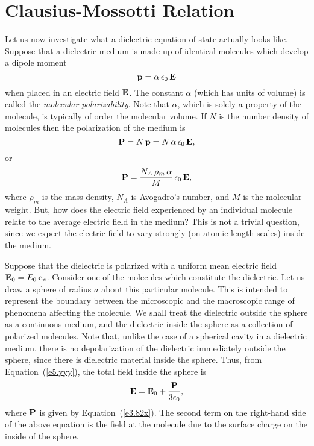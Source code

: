 \section{Clausius-Mossotti Relation}
Let us now investigate  what a dielectric equation of state actually looks like.
Suppose that a dielectric medium is made up of identical molecules which
develop a dipole moment 
\begin{equation}
{\bf p} = \alpha\,\epsilon_0 \,{\bf E} 
\end{equation}
when placed in an electric field ${\bf E}$. The constant $\alpha$ (which has units of volume) is called
the {\em molecular polarizability}. Note that $\alpha$, which is solely a property of the molecule, is typically of order the
molecular volume.
If $N$ is the number density of
 molecules
then the polarization of the medium is
\begin{equation}
{\bf P} = N \,{\bf p} = N\,\alpha \,\epsilon_0 \,{\bf E},
\end{equation}
or
\begin{equation}\label{e3.82x}
{\bf P} = \frac{N_A\, \rho_m\, \alpha}{M} \,\epsilon_0 \,{\bf E},
\end{equation}
where $\rho_m$ is the mass density, $N_A$ is Avogadro's number, and $M$ is 
the molecular weight. But, how does the electric field experienced
by an individual molecule relate to the average electric field in the
medium? This is not a trivial question, since we expect the electric
field to vary strongly (on atomic length-scales) inside the medium.

Suppose that the dielectric is polarized with a uniform mean electric field
${\bf E}_0 = E_0\,{\bf e}_z$. Consider one of the molecules which constitute
the dielectric. Let us draw a sphere of radius $a$ about this particular
molecule. This is intended to represent the boundary between the microscopic
and the macroscopic range of phenomena affecting the molecule. We shall
treat the dielectric outside the sphere as a continuous medium, and the
dielectric inside the sphere as a collection of polarized molecules. 
Note that, unlike the case of a spherical cavity in a dielectric medium,
there is no depolarization of the dielectric immediately outside the sphere,
since there is dielectric material inside the sphere.
Thus, from Equation~(\ref{e5.yyy}), the total field inside the sphere is 
\begin{equation}
{\bf E} = {\bf E}_0 + \frac{\bf P}{3\epsilon_0},
\end{equation}
where ${\bf P}$ is given by Equation~(\ref{e3.82x}).  The second term on the right-hand side of the above equation is the field
at the molecule due to the surface charge on the inside of the sphere.

